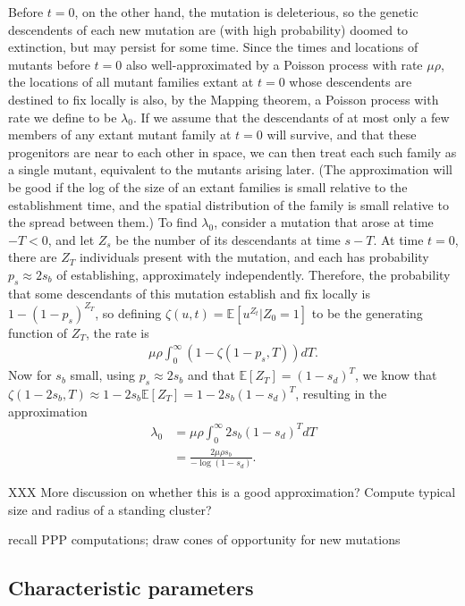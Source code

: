 \documentclass{article}
\newcommand{\E}{\mathbb{E}}
\begin{document}
Before $t=0$, on the other hand, the mutation is deleterious, so the genetic descendents of each new mutation are (with high probability) doomed to extinction,
but may persist for some time.
Since the times and locations of mutants before $t=0$ also well-approximated by a Poisson process with rate $\mu \rho$,
the locations of all mutant families extant at $t=0$ whose descendents are destined to fix locally is also,
by the Mapping theorem, a Poisson process with rate we define to be $\lambda_0$.
If we assume that the descendants of at most only a few members of any extant mutant family at $t=0$ will survive,
and that these progenitors are near to each other in space, we can then treat each such family as a single mutant,
equivalent to the mutants arising later.
(The approximation will be good if the log of the size of an extant families is small relative to the establishment time,
and the spatial distribution of the family is small relative to the spread between them.)
To find $\lambda_0$, consider a mutation that arose at time $-T<0$, and let $Z_s$ be the number of its descendants at time $s-T$.
At time $t=0$, there are $Z_T$ individuals present with the mutation,
and each has probability $p_s \approx 2s_b$ of establishing, approximately independently.
Therefore, the probability that some descendants of this mutation establish and fix locally is $1-(1-p_s)^{Z_T}$,
so defining $\zeta(u,t) = \E[u^{Z_t} | Z_0=1 ]$ to be the generating function of $Z_T$,
the rate is
\begin{align*}
    \mu \rho \int_0^\infty \left( 1- \zeta(1-p_s,T) \right) dT .
\end{align*}
Now for $s_b$ small, using $p_s \approx 2s_b$ and that $\E[Z_T]=(1-s_d)^T$,
we know that $\zeta(1-2s_b,T) \approx 1-2s_b \E[Z_T] = 1-2s_b (1-s_d)^T$,
resulting in the approximation
\begin{align}
    \lambda_0 &= \mu \rho \int_0^\infty 2s_b (1-s_d)^{T} dT \\
        &= \frac{ 2 \mu \rho s_b }{ -\log(1-s_d) } .
\end{align}

XXX More discussion on whether this is a good approximation?  
Compute typical size and radius of a standing cluster?

recall PPP computations; draw cones of opportunity for new mutations 

\subsection{Characteristic parameters}
\end{document}

